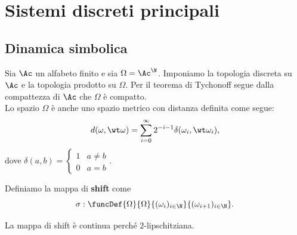 \chapter{Sistemi discreti principali}

\section{Dinamica simbolica}
Sia $\Ac$ un alfabeto finito e sia $\Omega=\Ac^\N$. Imponiamo la topologia discreta su $\Ac$ e la topologia prodotto su $\Omega$. Per il teorema di Tychonoff segue dalla compattezza di $\Ac$ che $\Omega$ \`e compatto.\\
Lo spazio $\Omega$ \`e anche uno spazio metrico con distanza definita come segue:
\[d(\omega,\wt \omega)=\sum_{i=0}^\infty 2^{-i-1}\delta(\omega_i,\wt \omega_i),\]
dove $\delta(a,b)=\begin{cases}
1 & a\neq b\\
0 & a=b
\end{cases}$.

\begin{definition}[Shift]
Definiamo la mappa di \textbf{shift} come
\[\sigma:\funcDef{\Omega}{\Omega}{(\omega_i)_{i\in\N}}{(\omega_{i+1})_{i\in\N}}.\]
\end{definition}
\begin{remark}
La mappa di shift \`e continua perch\'e $2$-lipschitziana.
\end{remark}

